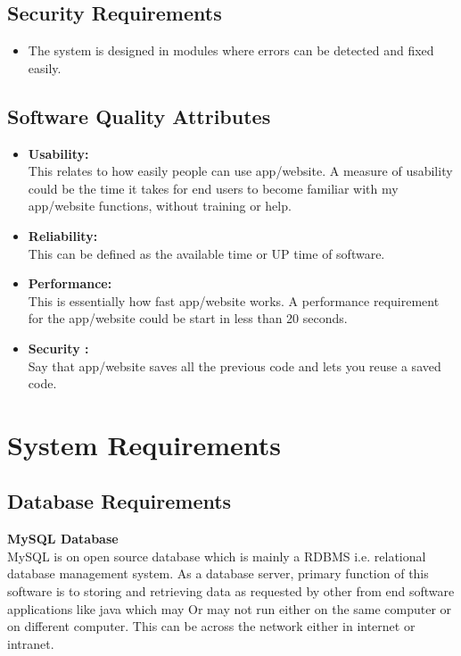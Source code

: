 \documentclass[oneside,a4paper,12pt]{report}
\begin{document}
\subsection{Security Requirements}
\begin{itemize}
\item The system is designed in modules where errors can be detected and fixed easily.
\end{itemize}

\subsection{Software Quality Attributes}
\begin{itemize}
\item \textbf{Usability: }\\
\hspace*{0.5cm} This relates to how easily people can use app/website. A measure of usability could be the time it takes for end users to become familiar with my app/website functions, without training or help.
\item \textbf{Reliability:}\\
\hspace*{0.5cm} This can be defined as the available time or UP time of software.
\item \textbf{Performance: }\\
\hspace*{0.5cm} This is essentially how fast app/website works. A performance requirement for the app/website could be start in less than 20 seconds.
\item \textbf{Security :}\\
\hspace*{0.5cm} Say that app/website saves all the previous code and lets you reuse a saved code.
\end{itemize}


\newpage
\section{System Requirements}
\subsection{Database Requirements}
\textbf{MySQL Database}\\
\hspace*{0.5cm} MySQL is on open source database which is mainly a RDBMS i.e. relational database management system. As a database server, primary function of this software is to storing and retrieving data as requested by other from end software applications like java which may  Or may not run either on the same computer or on different computer. This can be across the network either in internet or intranet.
\end{document}
